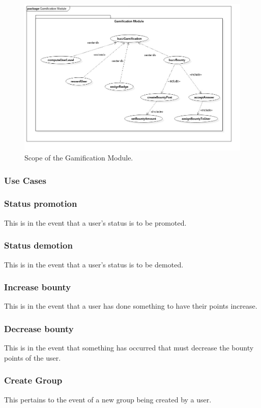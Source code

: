 \documentclass[12pt]{article}
\begin{document}
\begin{figure}[h!]\includegraphics[width=\linewidth]{Diagrams/buzzGami.jpg}
\caption{Scope of the Gamification Module.}
\label{Use-case: Gamification}
\end{figure}
\subsubsection{Use Cases}
\subsubsection*{Status promotion}
\par{This is in the event that a user's status is to be promoted.}
\subsubsection*{Status demotion}
\par{This is in the event that a user's status is to be demoted.}
\subsubsection*{Increase bounty}
\par{This is in the event that a user has done something to have their points increase.}
\subsubsection*{Decrease bounty}
\par{This is in the event that something has occurred that must decrease the bounty points of the user.}
\subsubsection*{Create Group}
\par{This pertains to the event of a new group being created by a user.}
\end{document}
